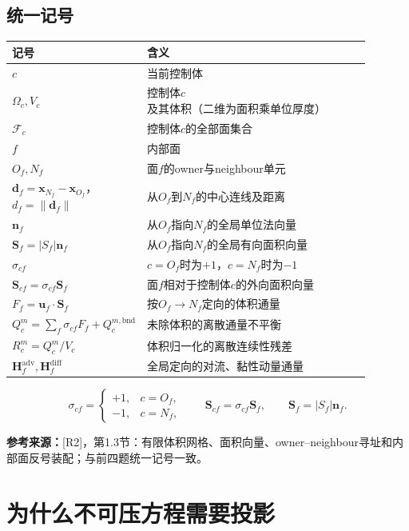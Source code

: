 \documentclass[UTF8,12pt,a4paper]{ctexart}
\numberwithin{equation}{section}
\newcommand{\Rtwo}{\textnormal{[R2]}}
\newcommand{\source}[1]{\par\smallskip\noindent\colorbox{sourcebg}{%
  \parbox{0.955\linewidth}{\footnotesize\color{sourcegray}\textbf{参考来源：}#1}}\par\smallskip}
\begin{document}
\subsection*{统一记号}
\begin{longtable}{>{\centering\arraybackslash}p{0.21\linewidth}p{0.68\linewidth}}
\toprule
记号 & 含义\\
\midrule
$c$ & 当前控制体\\
$\Omega_c,V_c$ & 控制体$c$及其体积（二维为面积乘单位厚度）\\
$\mathcal F_c$ & 控制体$c$的全部面集合\\
$f$ & 内部面\\
$O_f,N_f$ & 面$f$的owner与neighbour单元\\
$\bm d_f=\bm x_{N_f}-\bm x_{O_f}$，$d_f=\lVert\bm d_f\rVert$ & 从$O_f$到$N_f$的中心连线及距离\\
$\bm n_f$ & 从$O_f$指向$N_f$的全局单位法向量\\
$\bm S_f=|S_f|\bm n_f$ & 从$O_f$指向$N_f$的全局有向面积向量\\
$\sigma_{cf}$ & $c=O_f$时为$+1$，$c=N_f$时为$-1$\\
$\bm S_{cf}=\sigma_{cf}\bm S_f$ & 面$f$相对于控制体$c$的外向面积向量\\
$F_f=\bm u_f\cdot\bm S_f$ & 按$O_f\to N_f$定向的体积通量\\
$Q_c^m=\sum_f\sigma_{cf}F_f+Q_c^{m,\mathrm{bnd}}$ & 未除体积的离散通量不平衡\\
$R_c^m=Q_c^m/V_c$ & 体积归一化的离散连续性残差\\
$\bm H_f^{\mathrm{adv}},\bm H_f^{\mathrm{diff}}$ & 全局定向的对流、黏性动量通量\\
\bottomrule
\end{longtable}
\begin{equation}
  \boxed{\sigma_{cf}=\begin{cases}+1,&c=O_f,\\-1,&c=N_f,\end{cases}
  \qquad\bm S_{cf}=\sigma_{cf}\bm S_f,\qquad\bm S_f=|S_f|\bm n_f.}
  \label{eq:orientation}
\end{equation}
\source{\Rtwo，第1.3节：有限体积网格、面积向量、owner--neighbour寻址和内部面反号装配；与前四题统一记号一致。}

\section{为什么不可压方程需要投影}
\end{document}
